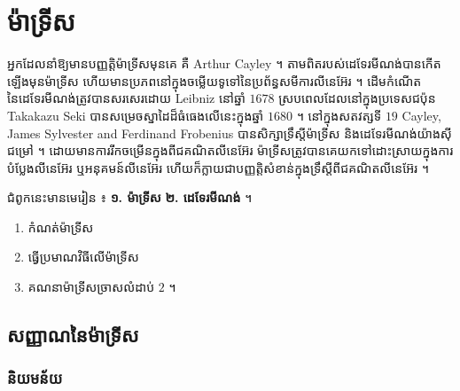 \chapter{ម៉ាទ្រីស}

អ្នកដែលនាំឱ្យមានបញ្ញត្តិម៉ាទ្រីសមុនគេ គឺ Arthur Cayley ។ តាមពិតរបស់ដេទែរមីណង់បានកើតឡើងមុនម៉ាទ្រីស ហើយមានប្រភពនៅក្នុងចម្លើយទូទៅនៃប្រព័ន្ធសមីការលីនេអ៊ែរ ។ ដើមកំណើតនៃដេទែរមីណង់ត្រូវបានសរសេរដោយ Leibniz នៅឆ្នាំ $1678$ ស្របពេលដែលនៅក្នុងប្រទេសជប៉ុន Takakazu Seki បានសម្រេចស្នាដៃដ៏ធំធេងលើនេះក្នុងឆ្នាំ $1680$ ។ នៅក្នុងសតវត្សទី $19$ Cayley, James Sylvester and Ferdinand Frobenius បានសិក្សាទ្រឹស្តីម៉ាទ្រីស និងដេទែរមីណង់យ៉ាងស៊ីជម្រៅ ។ ដោយមានការរីកចម្រើនក្នុងពីជគណិតលីនេអ៊ែរ ម៉ាទ្រីសត្រូវបានគេយកទៅដោះស្រាយក្នុងការបំប្លែងលីនេអ៊ែរ ឬអនុគមន៍លីនេអ៊ែរ ហើយក៏ក្លាយជាបញ្ញត្តិសំខាន់ក្នុងទ្រឹស្តីពីជគណិតលីនេអ៊ែរ ។

\begin{note}[ជំពូកទី ៤ ៖ ម៉ាទ្រីសនិងដេទែរមីណង់]
ជំពូកនេះមានមេរៀន ៖ \textbf{១. ម៉ាទ្រីស} \quad \textbf{២. ដេទែរមីណង់} ។
\end{note}

\begin{objBox}[វត្ថុបំណង]
\begin{enumerate}[1]
  \item កំណត់ម៉ាទ្រីស
  \item ធ្វើប្រមាណវិធីលើម៉ាទ្រីស
  \item គណនាម៉ាទ្រីសច្រាសលំដាប់ $2$ ។
\end{enumerate}
\end{objBox}

\section{សញ្ញាណនៃម៉ាទ្រីស}

\subsection{និយមន័យ}

